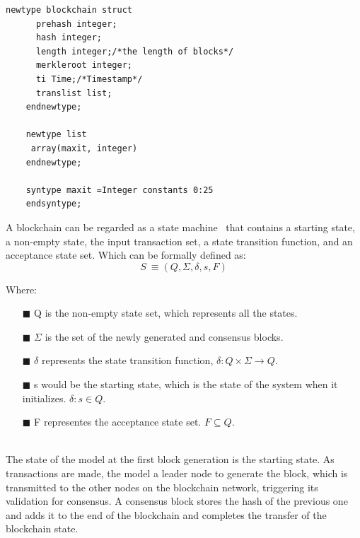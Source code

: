 \documentclass[sigconf, nonacm]{acmart}
\begin{document}
  \begin{lstlisting}[frame=single,label={lst:block-code},
    caption={Definition of a block's structure},captionpos=b, basicstyle=\ttfamily]
    newtype blockchain struct
      prehash integer;
      hash integer;
      length integer;/*the length of blocks*/
      merkleroot integer;
      ti Time;/*Timestamp*/
      translist list;
    endnewtype;

    newtype list
     array(maxit, integer)
    endnewtype;
 
    syntype maxit =Integer constants 0:25
    endsyntype;
  \end{lstlisting}
  
  A blockchain can be regarded as a state machine~\cite{Duan2018} that contains a starting state, a non-empty state, the input transaction set,
  a state transition function, and an acceptance state set. Which can be formally defined as:
    \begin{displaymath}
      S~\equiv(Q,\Sigma,\delta,s,F)
    \end{displaymath}

  Where:

  \begin{enumerate}
    \item[$\blacksquare$] Q is the non-empty state set, which represents all the states.
    \item[$\blacksquare$] $\Sigma$ is the set of the newly generated and consensus blocks. 
    \item[$\blacksquare$] $\delta$ represents the state transition function,
      \begin{math}
        \delta: Q \times \Sigma \rightarrow Q
      \end{math}.
    \item[$\blacksquare$] s would be the starting state, which is the state of the system when it initializes.
      \begin{math}
        \delta: s \in Q
      \end{math}.
    \item[$\blacksquare$] F representes the acceptance state set.
      \begin{math}
        F \subseteq Q
      \end{math}.
  \end{enumerate}
  \  \\ %
  The state of the model at the first block generation is the starting state.
  As transactions are made, the model a leader node to generate the block, which is transmitted to the other nodes on the blockchain network,
  triggering its validation for consensus. 
  A consensus block stores the hash of the previous one and adds it to the end of the blockchain and completes the transfer of the blockchain state.
  
\end{document}
